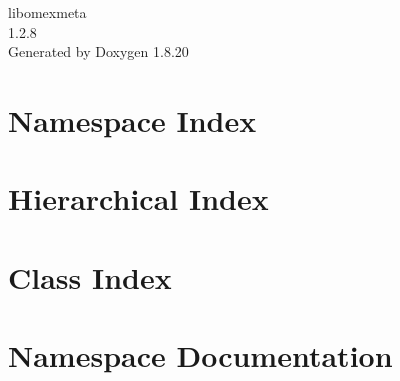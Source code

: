 \let\mypdfximage\pdfximage\def\pdfximage{\immediate\mypdfximage}\documentclass[twoside]{book}
\newcommand{\+}{\discretionary{\mbox{\scriptsize$\hookleftarrow$}}{}{}}
\newcommand{\clearemptydoublepage}{%
  \newpage{\pagestyle{empty}\cleardoublepage}%
}
\begin{document}
\hypersetup{pageanchor=false,
             bookmarksnumbered=true,
             pdfencoding=unicode
            }
\begin{titlepage}
\vspace*{7cm}
\begin{center}%
{\Large libomexmeta \\[1ex]\large 1.\+2.\+8 }\\
\vspace*{1cm}
{\large Generated by Doxygen 1.8.20}\\
\end{center}
\end{titlepage}
\clearemptydoublepage
{}
\tableofcontents
\clearemptydoublepage
{}
\hypersetup{pageanchor=true}

\chapter{Namespace Index}

\chapter{Hierarchical Index}

\chapter{Class Index}

\chapter{Namespace Documentation}

\end{document}
